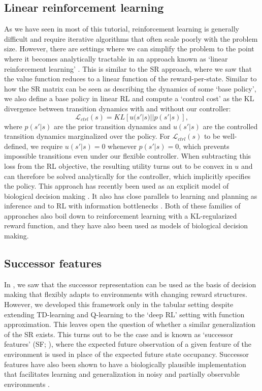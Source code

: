 \subsection{Linear reinforcement learning}
\label{sec:linear_RL}
As we have seen in most of this tutorial, reinforcement learning is generally difficult and require iterative algorithms that often scale poorly with the problem size.
However, there are settings where we can simplify the problem to the point where it becomes analytically tractable in an approach known as `linear reinforcement learning' \citep{todorov2006linearly, todorov2009efficient}.
This is similar to the SR approach, where we saw that the value function reduces to a linear function of the reward-per-state.
Similar to how the SR matrix can be seen as describing the dynamics of some `base policy', we also define a base policy in linear RL and compute a `control cost' as the KL divergence between transition dynamics with and without our controller:
\begin{equation}
    \mathcal{L}_{ctrl}(s) = KL \left [ u(s' | s) || p(s'|s) \right ],
\end{equation}
where $p(s' | s)$ are the prior transition dynamics and $u(s' | s)$ are the controlled transition dynamics marginalized over the policy.
For $\mathcal{L}_{ctrl}(s)$ to be well-defined, we require $u(s'|s) = 0$ whenever $p(s'|s) = 0$, which prevents impossible transitions even under our flexible controller.
When subtracting this loss from the RL objective, the resulting utility turns out to be convex in $u$ and can therefore be solved analytically for the controller, which implicitly specifies the policy.
This approach has recently been used as an explicit model of biological decision making \citep{piray2021linear}.
It also has close parallels to learning and planning as inference \citep{levine2018reinforcement, solway2012goal,botvinick2012planning} and to RL with information bottlenecks \citep{lai2021policy}.
Both of these families of approaches also boil down to reinforcement learning with a KL-regularized reward function, and they have also been used as models of biological decision making.

\subsection{Successor features}
\label{sec:SFs}
In , we saw that the successor representation can be used as the basis of decision making that flexibly adapts to environments with changing reward structures.
However, we developed this framework only in the tabular setting despite extending TD-learning and Q-learning to the `deep RL' setting with function approximation.
This leaves open the question of whether a similar generalization of the SR exists.
This turns out to be the case and is known as `successor features' (SF; \citealp{barreto2017successor}), where the expected future observation of a given feature of the environment is used in place of the expected future state occupancy.
Successor features have also been shown to have a biologically plausible implementation that facilitates learning and generalization in noisy and partially observable environments \citep{vertes2019neurally}.


